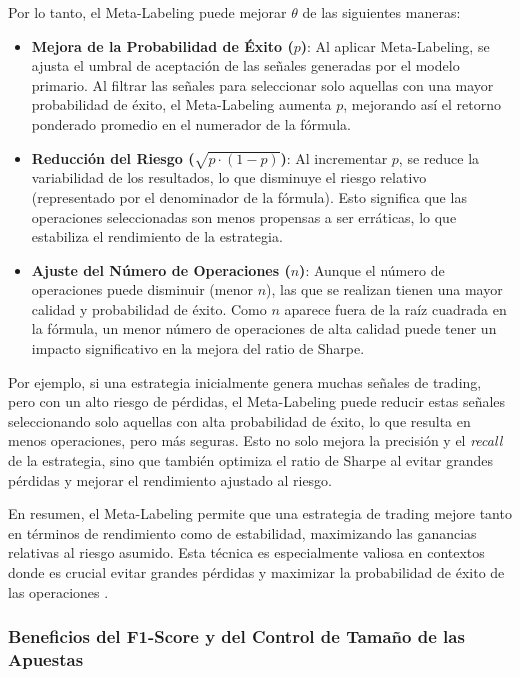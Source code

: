 \documentclass[a4paper,12pt, twoside]{report}
\begin{document}
Por lo tanto, el Meta-Labeling puede mejorar \(\theta\) de las siguientes maneras:

\begin{itemize}
    \item \textbf{Mejora de la Probabilidad de Éxito ($p$)}: Al aplicar Meta-Labeling, 
    se ajusta el umbral de aceptación de las señales generadas por el modelo primario. 
    Al filtrar las señales para seleccionar solo aquellas con una mayor probabilidad 
    de éxito, el Meta-Labeling aumenta $p$, mejorando así el retorno ponderado promedio en el 
    numerador de la fórmula.
    
    \item \textbf{Reducción del Riesgo (\(\sqrt{p \cdot (1 - p)}\))}: Al incrementar \(p\), 
    se reduce la variabilidad de los resultados, lo que disminuye el riesgo relativo (representado 
    por el denominador de la fórmula). Esto significa que las operaciones seleccionadas son menos 
    propensas a ser erráticas, lo que estabiliza el rendimiento de la estrategia.
    
    \item \textbf{Ajuste del Número de Operaciones ($n$)}: Aunque el número de operaciones puede 
    disminuir (menor $n$), las que se realizan tienen una mayor calidad y probabilidad de éxito. 
    Como \(n\) aparece fuera de la raíz cuadrada en la fórmula, un menor número de operaciones de 
    alta calidad puede tener un impacto significativo en la mejora del ratio de Sharpe.
\end{itemize}


Por ejemplo, si una estrategia inicialmente genera muchas señales de trading, 
pero con un alto riesgo de pérdidas, el Meta-Labeling puede reducir estas señales 
seleccionando solo aquellas con alta probabilidad de éxito, lo que resulta en menos 
operaciones, pero más seguras. Esto no solo mejora la precisión y el \textit{recall} 
de la estrategia, sino que también optimiza el ratio de Sharpe al evitar grandes 
pérdidas y mejorar el rendimiento ajustado al riesgo.

En resumen, el Meta-Labeling permite que una estrategia de trading mejore tanto en 
términos de rendimiento como de estabilidad, maximizando las ganancias relativas al 
riesgo asumido. Esta técnica es especialmente valiosa en contextos donde es crucial 
evitar grandes pérdidas y maximizar la probabilidad de éxito de las 
operaciones \cite{lopezdeprado2018afml}.


\subsubsection{Beneficios del F1-Score y del Control de Tamaño de las Apuestas}
\end{document}
